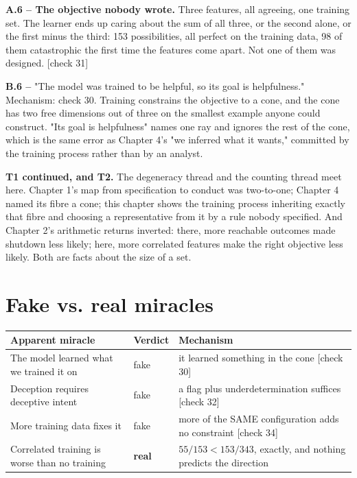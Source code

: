 \textbf{A.6 -- The objective nobody wrote.} Three features, all agreeing, one training set. The learner ends up caring about the sum of all three, or the second alone, or the first minus the third: 153 possibilities, all perfect on the training data, 98 of them catastrophic the first time the features come apart. Not one of them was designed. [check 31]

\textbf{B.6 --} "The model was trained to be helpful, so its goal is helpfulness." Mechanism: check 30. Training constrains the objective to a cone, and the cone has two free dimensions out of three on the smallest example anyone could construct. "Its goal is helpfulness" names one ray and ignores the rest of the cone, which is the same error as Chapter 4's "we inferred what it wants," committed by the training process rather than by an analyst.

\textbf{T1 continued, and T2.} The degeneracy thread and the counting thread meet here. Chapter 1's map from specification to conduct was two-to-one; Chapter 4 named its fibre a cone; this chapter shows the training process inheriting exactly that fibre and choosing a representative from it by a rule nobody specified. And Chapter 2's arithmetic returns inverted: there, more reachable outcomes made shutdown less likely; here, more correlated features make the right objective less likely. Both are facts about the size of a set.

\section*{Fake vs. real miracles}

\noindent

\noindent
\begin{tabularx}{\textwidth}{XXX}
\toprule
Apparent miracle & Verdict & Mechanism \\
\midrule
The model learned what we trained it on & fake & it learned something in the cone [check 30] \\
Deception requires deceptive intent & fake & a flag plus underdetermination suffices [check 32] \\
More training data fixes it & fake & more of the SAME configuration adds no constraint [check 34] \\
Correlated training is worse than no training & \textbf{real} & $55/153 < 153/343$, exactly, and nothing predicts the direction \\
\bottomrule
\end{tabularx}
\par\medskip

